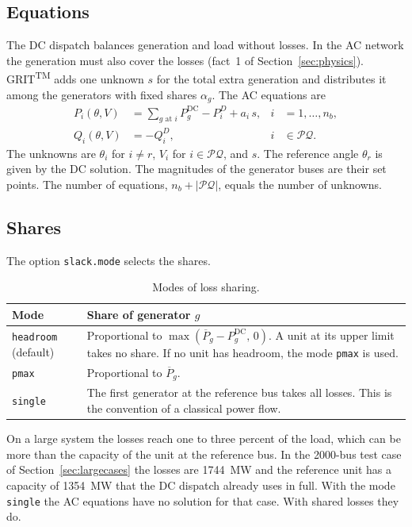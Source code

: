 \documentclass[a4paper,11pt]{article}
\newcommand{\TM}{\textsuperscript{TM}}
\newcommand{\GRIT}{GRIT\TM}
\newcommand{\opt}[1]{\texttt{#1}}
\begin{document}
\subsection{Equations}

The DC dispatch balances generation and load without losses. In the AC network the generation must also cover the losses (fact~1 of Section~\ref{sec:physics}). \GRIT{} adds one unknown $s$ for the total extra generation and distributes it among the generators with fixed shares $\alpha_g$. The AC equations are
\begin{align}
P_i(\theta,V) &= \sum_{g \text{ at } i} P^{\mathrm{DC}}_g - P^D_i + a_i\, s, & i &= 1,\dots,n_b, \label{eq:P}\\
Q_i(\theta,V) &= -Q^D_i, & i &\in \mathcal{PQ}. \label{eq:Q}
\end{align}
The unknowns are $\theta_i$ for $i\neq r$, $V_i$ for $i\in\mathcal{PQ}$, and $s$. The reference angle $\theta_r$ is given by the DC solution. The magnitudes of the generator buses are their set points. The number of equations, $n_b+|\mathcal{PQ}|$, equals the number of unknowns.

\subsection{Shares}

The option \opt{slack.mode} selects the shares.

\begin{table}[H]\centering
\begin{tabular}{@{}lp{11.5cm}@{}}
\toprule
\textbf{Mode} & \textbf{Share of generator $g$} \\
\midrule
\texttt{headroom} (default) & Proportional to $\max(\overline{P}_g - P^{\mathrm{DC}}_g,\,0)$. A unit at its upper limit takes no share. If no unit has headroom, the mode \texttt{pmax} is used. \\
\texttt{pmax} & Proportional to $\overline{P}_g$. \\
\texttt{single} & The first generator at the reference bus takes all losses. This is the convention of a classical power flow. \\
\bottomrule
\end{tabular}
\caption{Modes of loss sharing.}
\end{table}

\begin{notebox}[title={Why the losses are shared}]
On a large system the losses reach one to three percent of the load, which can be more than the capacity of the unit at the reference bus. In the 2000-bus test case of Section~\ref{sec:largecases} the losses are 1744~MW and the reference unit has a capacity of 1354~MW that the DC dispatch already uses in full. With the mode \texttt{single} the AC equations have no solution for that case. With shared losses they do.
\end{notebox}
\end{document}
